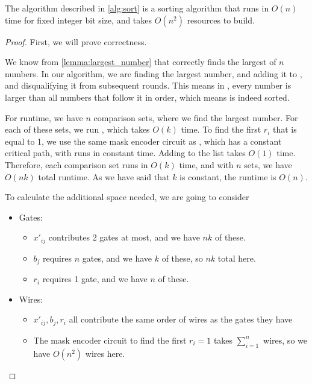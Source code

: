 \documentclass{article}
\begin{document}
\begin{theorem}
  The algorithm described in \ref{alg:sort} is a sorting algorithm that runs in $O(n)$ time for fixed integer bit size, and takes $O(n^2)$ resources to build.
\end{theorem}
\begin{proof}
  First, we will prove correctness.

  We know from \ref{lemma:largest_number} that \findLargest correctly finds the largest of $n$ numbers.
  In our algorithm, we are finding the largest number, and adding it to , and disqualifying it from subsequent rounds.
  This means in , every number is larger than all numbers that follow it in order, which means  is indeed sorted.

  For runtime, we have $n$ comparison sets, where we find the largest number. 
  For each of these sets, we run \findLargest, which takes $O(k)$ time.
  To find the first $r_i$ that is equal to 1, we use the same mask encoder circuit as \cite{ghosh}, which has a constant critical path, with runs in constant time.
  Adding to the  list takes $O(1)$ time.
  Therefore, each comparison set runs in $O(k)$ time, and with $n$ sets, we have $O(nk)$ total runtime. As we have said that $k$ is constant, the runtime is $O(n)$.

  To calculate the additional space needed, we are going to consider 
  \begin{itemize}
    \item Gates:
    \begin{itemize}
      \item $x'_{ij}$ contributes 2 gates at most, and we have $nk$ of these.
      \item $b_j$ requires $n$ gates, and we have $k$ of these, so $nk$ total here.
      \item $r_i$ requires 1 gate, and we have $n$ of these.
    \end{itemize}

    \item Wires:
    \begin{itemize}
      \item $x'_{ij}, b_j, r_i$ all contribute the same order of wires as the gates they have
      \item The mask encoder circuit to find the first $r_i = 1$ takes $\sum_{i=1}^n$ wires, so we have $O(n^2)$ wires here.
    \end{itemize}
    

\end{itemize}
\end{proof}
\end{document}
